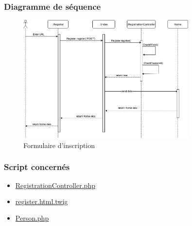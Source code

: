 \subsubsection{Diagramme de séquence}
	\begin{figure}[h]
		\includegraphics[width=0.8\textwidth,center]{Diagramme/sequence-us1}
		\caption{Formulaire d'inscription}
	\end{figure}
	
	
\subsubsection{Script concernés}
	\begin{itemize}
		\item \href{https://github.com/victorsmits/Aquabike/blob/master/backend/src/Controller/RegistrationController.php}{RegistrationController.php}
		\item \href{https://github.com/victorsmits/Aquabike/blob/master/backend/templates/registration/register.html.twig}{register.html.twig}
		\item \href{https://github.com/victorsmits/Aquabike/blob/master/backend/src/Entity/Person.php}{Person.php}
	\end{itemize}